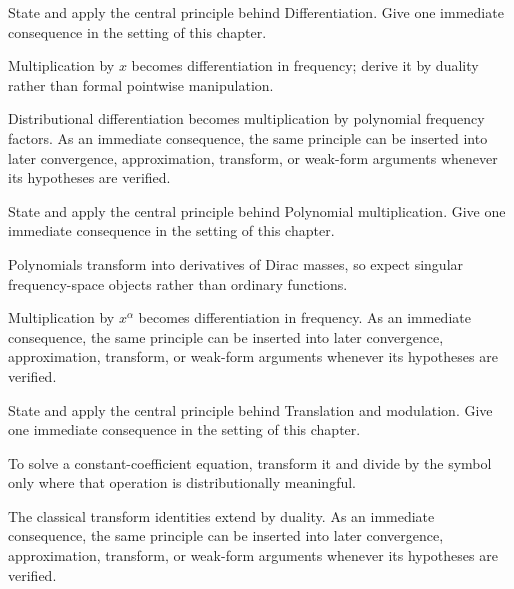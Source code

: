 \begin{exercise}\label{exr:iii19-04}
State and apply the central principle behind Differentiation. Give one immediate consequence in the setting of this chapter.
\end{exercise}
\begin{hint}
Multiplication by \(x\) becomes differentiation in frequency; derive it by duality rather than formal pointwise manipulation.
\end{hint}
\begin{solution}
Distributional differentiation becomes multiplication by polynomial frequency factors. As an immediate consequence, the same principle can be inserted into later convergence, approximation, transform, or weak-form arguments whenever its hypotheses are verified.
\end{solution}

\begin{exercise}\label{exr:iii19-05}
State and apply the central principle behind Polynomial multiplication. Give one immediate consequence in the setting of this chapter.
\end{exercise}
\begin{hint}
Polynomials transform into derivatives of Dirac masses, so expect singular frequency-space objects rather than ordinary functions.
\end{hint}
\begin{solution}
Multiplication by $x^\alpha$ becomes differentiation in frequency. As an immediate consequence, the same principle can be inserted into later convergence, approximation, transform, or weak-form arguments whenever its hypotheses are verified.
\end{solution}

\begin{exercise}\label{exr:iii19-06}
State and apply the central principle behind Translation and modulation. Give one immediate consequence in the setting of this chapter.
\end{exercise}
\begin{hint}
To solve a constant-coefficient equation, transform it and divide by the symbol only where that operation is distributionally meaningful.
\end{hint}
\begin{solution}
The classical transform identities extend by duality. As an immediate consequence, the same principle can be inserted into later convergence, approximation, transform, or weak-form arguments whenever its hypotheses are verified.
\end{solution}

